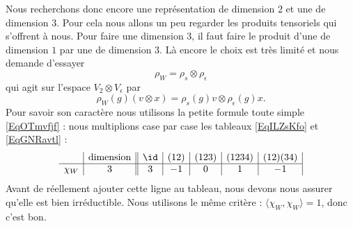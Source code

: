 Nous recherchons donc encore une représentation de dimension \( 2\) et une de dimension \( 3\). Pour cela nous allons un peu regarder les produits tensoriels qui s'offrent à nous. Pour faire une dimension \( 3\), il faut faire le produit d'une de dimension \( 1\) par une de dimension \( 3\). Là encore le choix est très limité et nous demande d'essayer
\begin{equation}
	\rho_W=\rho_s\otimes \rho_{\epsilon}
\end{equation}
qui agit sur l'espace \( V_2\otimes V_{\epsilon}\) par
\begin{equation}
	\rho_W(g)(v\otimes x)=\rho_s(g)v\otimes \rho_{\epsilon}(g)x.
\end{equation}
Pour savoir son caractère nous utilisons la petite formule toute simple \eqref{EqOTmvfjf} : nous multiplions case par case les tableaux \eqref{EqILZsKfo} et \eqref{EqGNRavtl} :
\begin{equation}
	\begin{array}[]{c|c||c|c|c|c|c|}
		         & \text{dimension} & \id & (12) & (123) & (1234) & (12)(34) \\
		\hline
		\chi_{W} & 3                & 3   & -1   & 0     & 1      & -1       \\
	\end{array}
\end{equation}
Avant de réellement ajouter cette ligne au tableau, nous devons nous assurer qu'elle est bien irréductible. Nous utilisons le même critère : \( \langle \chi_W, \chi_W\rangle =1\), donc c'est bon.

